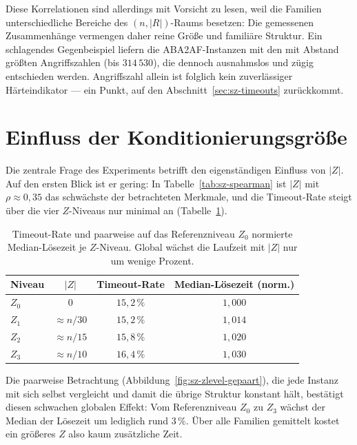 Diese Korrelationen sind allerdings mit Vorsicht zu lesen, weil die Familien
unterschiedliche Bereiche des \((n,|R|)\)-Raums besetzen: Die gemessenen
Zusammenh\"ange vermengen daher reine Gr\"o\ss e und famili\"are Struktur. Ein
schlagendes Gegenbeispiel liefern die ABA2AF-Instanzen mit den mit Abstand
gr\"o\ss ten Angriffszahlen (bis \(314\,530\)), die dennoch ausnahmslos und
z\"ugig entschieden werden. Angriffszahl allein ist folglich kein
zuverl\"assiger H\"arteindikator --- ein Punkt, auf den
Abschnitt~\ref{sec:sz-timeouts} zur\"uckkommt.

\section{Einfluss der Konditionierungsgr\"o\ss e}
\label{sec:sz-zeinfluss}

Die zentrale Frage des Experiments betrifft den eigenst\"andigen Einfluss von
\(|Z|\). Auf den ersten Blick ist er gering: In Tabelle~\ref{tab:sz-spearman}
ist \(|Z|\) mit \(\rho \approx 0{,}35\) das schw\"achste der betrachteten
Merkmale, und die Timeout-Rate steigt \"uber die vier \(Z\)-Niveaus nur
minimal an (Tabelle~\ref{tab:sz-zlevel}).

\begin{table}[htbp]
    \myfloatalign
    \begin{tabularx}{\textwidth}{Xccc} \toprule
        Niveau & \(|Z|\) & Timeout-Rate & Median-L\"osezeit (norm.) \\ \midrule
        \(Z_0\) & \(0\)            & \(15{,}2\,\%\) & \(1{,}000\) \\
        \(Z_1\) & \(\approx n/30\) & \(15{,}2\,\%\) & \(1{,}014\) \\
        \(Z_2\) & \(\approx n/15\) & \(15{,}8\,\%\) & \(1{,}020\) \\
        \(Z_3\) & \(\approx n/10\) & \(16{,}4\,\%\) & \(1{,}030\) \\
        \bottomrule
    \end{tabularx}
    \caption[Einfluss der Konditionierungsgr\"o\ss e]{Timeout-Rate und
    paarweise auf das Referenzniveau \(Z_0\) normierte Median-L\"osezeit je
    \(Z\)-Niveau. Global w\"achst die Laufzeit mit \(|Z|\) nur um wenige
    Prozent.}
    \label{tab:sz-zlevel}
\end{table}

Die paarweise Betrachtung (Abbildung~\ref{fig:sz-zlevel-gepaart}), die jede
Instanz mit sich selbst vergleicht und damit die \"ubrige Struktur konstant
h\"alt, best\"atigt diesen schwachen globalen Effekt: Vom Referenzniveau
\(Z_0\) zu \(Z_3\) w\"achst der Median der L\"osezeit um lediglich rund
\(3\,\%\). \"Uber alle Familien gemittelt kostet ein gr\"o\ss eres \(Z\) also
kaum zus\"atzliche Zeit.

